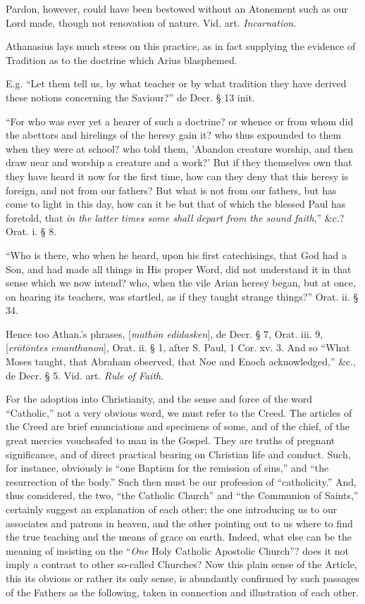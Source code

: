 Pardon, however, could have been bestowed without
an Atonement such as our Lord made, though not renovation of nature.
Vid. art. \emph{Incarnation}.


Athanasius
lays much stress on this practice, as in fact supplying the evidence
of Tradition as to the doctrine which Arius blasphemed.

E.g. ``Let them tell us, by what teacher or by
what tradition they have derived these notions concerning the Saviour?''
de Decr. § 13 init.

``For who was ever yet a hearer of such a
doctrine? or whence or from whom did the abettors and hirelings of the
heresy gain it? who thus expounded to them when they were at school?
who told them, 'Abandon creature worship, and then draw near and
worship a creature and a work?' But if they themselves own that they
have heard it now for the first time, how can they deny that this
heresy is foreign, and not from our fathers? But what is not from our
fathers, but has come to light in this day, how can it be but that of
which the blessed Paul has foretold, that \emph{in the latter times some
shall depart from the sound faith},''
\&c.? Orat. i. § 8.

``Who is there, who when he heard, upon his first
catechisings, that God had a Son, and had made all things in His
proper Word, did not understand it in that sense which we now intend?
who, when the vile Arian heresy began, but at once, on hearing its
teachers, was startled, as if they taught strange things?'' Orat.
ii. § 34.

Hence too Athan.'s phrases, [\emph{math\={o}n
edidasken}], de Decr. § 7, Orat. iii. 9, [\emph{er\={o}t\={o}ntes
emanthanon}], Orat. ii. § 1, after S. Paul, 1 Cor. xv. 3. And so ``What
Moses taught, that Abraham observed, that Noe and Enoch acknowledged,''
\&c., de Decr. § 5. Vid. art. \emph{Rule of Faith}.


For
the adoption into Christianity, and the sense and force of the word ``Catholic,''
not a very obvious word, we must refer to the Creed. The articles of
the Creed are brief enunciations and specimens of some, and of the
chief, of the great mercies vouchsafed to man in the Gospel. They are
truths of pregnant significance, and of direct practical bearing on
Christian life and conduct. Such, for instance, obviously is ``one
Baptism for the remission of sins,'' and ``the resurrection of the body.''
Such then must be our profession of ``catholicity.'' And, thus
considered, the two, ``the Catholic Church'' and ``the Communion of
Saints,'' certainly suggest an explanation of each other; the one
introducing us to our associates and patrons in heaven, and the other
pointing out to us where to find the true teaching and the means of
grace on earth. Indeed, what else can be the meaning of insisting on
the ``\emph{One} Holy
Catholic Apostolic Church''? does it not imply a contrast to other
so-called Churches? Now this plain sense of the Article, this its
obvious or rather its only sense, is abundantly confirmed by such
passages of the Fathers as the following, taken in connection and
illustration of each other.

